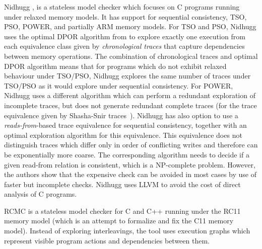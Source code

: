 Nidhugg , is a stateless model
checker which focuses on C programs running under relaxed memory models. It
has support for sequential consistency, TSO, PSO, POWER, and partially ARM
memory models.
For TSO and PSO, Nidhugg uses the optimal DPOR algorithm from  to explore exactly one execution from each equivalence class given by \emph{chronological traces} that capture dependencies between memory operations.
The combination of chronological traces and optimal DPOR algorithm means that
for programs which do not exhibit relaxed behaviour under TSO/PSO, Nidhugg
explores the same number of traces under TSO/PSO as it would explore under
sequential consistency.
For POWER, Nidhugg uses a different algorithm which can perform a redundant exploration of incomplete traces, but does not generate redundant complete traces (for the trace equivalence given by Shasha-Snir traces~).
Nidhugg has also option to use a \emph{reads-from}-based trace equivalence for sequential consistency, together with an optimal exploration algorithm for this equivalence.
This equivalence does not distinguish traces which differ only in order of conflicting writes and therefore can be exponentially more coarse.
The corresponding algorithm needs to decide if a given read-from relation is consistent, which is a NP-complete problem.
However, the authors show that the expensive check can be avoided in most cases by use of faster but incomplete checks.
Nidhugg uses LLVM to avoid the cost of direct analysis of C programs.


RCMC  is a stateless model checker for C and C++ running under the RC11 memory model  (which is an attempt to formalize and fix the C11 memory model).
Instead of exploring interleavings, the tool uses execution graphs which represent visible program actions and dependencies between them.

